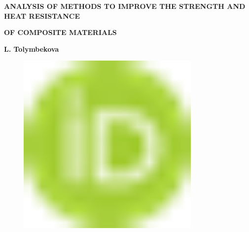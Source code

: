 
{\bfseries ANALYSIS OF METHODS TO IMPROVE THE STRENGTH AND HEAT RESISTANCE}

{\bfseries OF COMPOSITE MATERIALS}

{\bfseries L.
Tolymbekova}
\begin{figure}[H]
	\centering
	\includegraphics[width=0.8\textwidth]{media/chem2/image1}
	\caption*{}
\end{figure}

